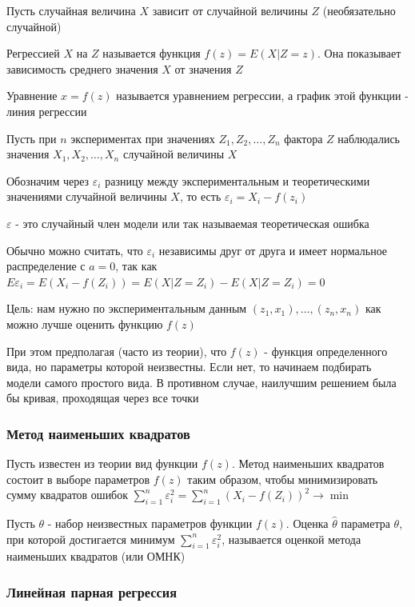 \documentclass[12pt]{article}
\begin{document}
Пусть случайная величина $X$ зависит от случайной величины $Z$ (необязательно случайной)

\Def Регрессией $X$ на $Z$ называется функция $f(z) = E(X|Z = z)$. 
Она показывает зависимость среднего значения $X$ от значения $Z$

Уравнение $x = f(z)$ называется уравнением регрессии, а график этой функции - линия регрессии

Пусть при $n$ экспериментах при значениях $Z_1, Z_2, \dots, Z_n$ фактора $Z$ наблюдались значения
$X_1, X_2, \dots, X_n$ случайной величины $X$

Обозначим через $\varepsilon_i$ разницу между экспериментальным и теоретическими значениями случайной величины $X$,
то есть $\varepsilon_i = X_i - f(z_i)$

$\varepsilon$ - это случайный член модели или так называемая теоретическая ошибка

\Nota Обычно можно считать, что $\varepsilon_i$ независимы друг от друга и имеет нормальное распределение с $a = 0$,
так как $E\varepsilon_i = E(X_i - f(Z_i)) = E(X | Z = Z_i) - E(X | Z = Z_i) = 0$

Цель: нам нужно по экспериментальным данным $(z_1, x_1), \dots, (z_n, x_n)$ как можно лучше оценить функцию $f(z)$

\Notas При этом предполагая (часто из теории), что $f(z)$ - функция определенного вида, но параметры которой неизвестны.
Если нет, то начинаем подбирать модели самого простого вида. В противном случае, наилучшим решением была бы кривая, 
проходящая через все точки 

\subsubsection{Метод наименьших квадратов}

Пусть известен из теории вид функции $f(z)$. Метод наименьших квадратов состоит в выборе параметров $f(z)$ таким образом,
чтобы минимизировать сумму квадратов ошибок $\sum_{i = 1}^n \varepsilon_i^2 = \sum_{i = 1}^n (X_i - f(Z_i))^2 \rightarrow \min$

\Def Пусть $\theta$ - набор неизвестных параметров функции $f(z)$. Оценка $\hat \theta$ параметра $\theta$, 
при которой достигается минимум $\sum_{i = 1}^n \varepsilon_i^2$, называется оценкой метода наименьших квадратов (или ОМНК)

\subsubsection{Линейная парная регрессия}
\end{document}
